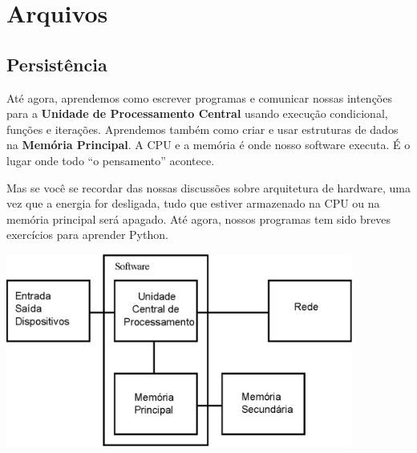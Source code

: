 
\chapter{Arquivos}


\section{Persistência}


Até agora, aprendemos como escrever programas e comunicar nossas
intenções para a {\bf Unidade de Processamento Central} usando execução
condicional, funções e iterações. Aprendemos também como criar e usar 
estruturas de dados na {\bf Memória Principal}. A CPU e a memória é onde
nosso software executa. É o lugar onde todo ``o pensamento'' acontece.

Mas se você se recordar das nossas discussões sobre arquitetura de hardware,
uma vez que a energia for desligada, tudo que estiver armazenado na CPU
ou na memória principal será apagado. Até agora, nossos
programas tem sido breves exercícios para aprender Python.

\beforefig
\centerline{\includegraphics[height=2.50in]{figs2/arch3.eps}}
\afterfig


